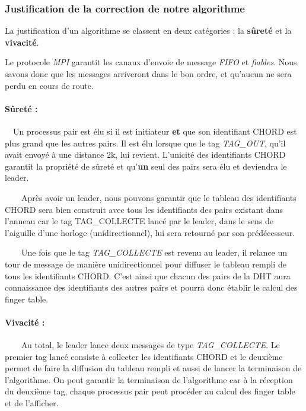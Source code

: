 \documentclass[
]{article}
\begin{document}
\hypertarget{justification-de-la-correction-de-notre-algorithme}{%
\subsubsection{Justification de la correction de notre
algorithme}\label{justification-de-la-correction-de-notre-algorithme}}

La justification d'un algorithme se classent en deux catégories : la
\textbf{sûreté} et la \textbf{vivacité}.

Le protocole \emph{MPI} garantit les canaux d'envoie de message
\emph{FIFO} et \emph{fiables}. Nous savons donc que les messages
arriveront dans le bon ordre, et qu'aucun ne sera perdu en cours de
route.

\hypertarget{suxfbretuxe9}{%
\paragraph{Sûreté :}\label{suxfbretuxe9}}

 Un processus pair est élu si il est initiateur \textbf{et} que son
identifiant CHORD est plus grand que les autres pairs. Il est élu
lorsque que le tag \emph{TAG\_OUT}, qu'il avait envoyé à une distance
2k, lui revient. L'unicité des identifiants CHORD garantit la propriété
de sûreté et qu'\textbf{un} seul des pairs sera élu et deviendra le
leader.

  Après avoir un leader, nous pouvons garantir que le tableau des
identifiants CHORD sera bien construit avec tous les identifiants des
pairs existant dans l'anneau car le tag TAG\_COLLECTE lancé par le
leader, dans le sens de l'aiguille d'une horloge (unidirectionnel), lui
sera retourné par son prédécesseur.

  Une fois que le tag \emph{TAG\_COLLECTE} est revenu au leader, il
relance un tour de message de manière unidirectionnel pour diffuser le
tableau rempli de tous les identifiants CHORD. C'est ainsi que chacun
des pairs de la DHT aura connaissance des identifiants des autres pairs
et pourra donc établir le calcul des finger table.

\hypertarget{vivacituxe9}{%
\paragraph{Vivacité :}\label{vivacituxe9}}

  Au total, le leader lance deux messages de type \emph{TAG\_COLLECTE}.
Le premier tag lancé consiste à collecter les identifiants CHORD et le
deuxième permet de faire la diffusion du tableau rempli et aussi de
lancer la terminaison de l'algorithme. On peut garantir la terminaison
de l'algorithme car à la réception du deuxième tag, chaque processus
pair peut procéder au calcul des finger table et de l'afficher.
\end{document}
